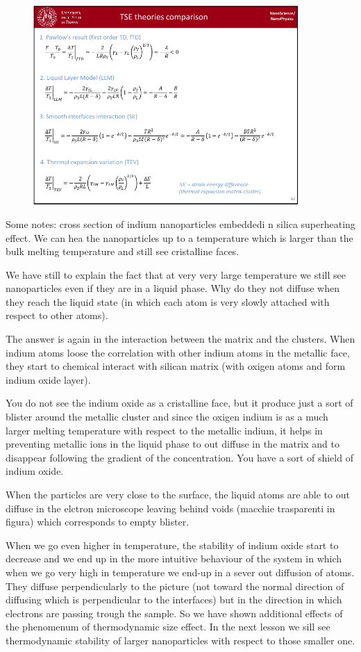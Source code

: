 \documentclass[../main/main.tex]{subfiles}
\begin{document}
\begin{figure}[h!]
\centering
\includegraphics[page=2,width=0.9\textwidth]{../lessons/pdf_file/5_lesson.pdf}
\end{figure}

Some notes: cross section of indium nanoparticles embeddedi n silica superheating effect. We can hea the nanoparticles up to a temperature which is larger than the bulk melting temperature and still see cristalline faces.

We have still to explain the fact that at very very large temperature we still see nanoparticles even if they are in a liquid phase. Why do they not diffuse when they reach the liquid state (in which each atom is very slowly attached with respect to other atoms).

The answer is again in the interaction between the matrix and the clusters. When indium atoms loose the correlation with other indium atoms in the metallic face, they start to chemical interact with silican matrix (with oxigen atoms and form indium oxide layer).

You do not see the indium oxide as a cristalline face, but it produce just a sort of blister around the metallic cluster and since the oxigen indium is as a much larger melting temperature with respect to the metallic indium, it helps in preventing metallic ions in the liquid phase to out diffuse in the matrix and to disappear following the gradient of the concentration. You have a sort of shield of indium oxide.

When the particles are very close to the surface, the liquid atoms are able to out diffuse in the elctron microscope leaving behind voids (macchie trasparenti in figura) which corresponds to empty blister.

When we go even higher in temperature, the stability of indium oxide start to decrease and we end up in the more intuitive behaviour of the system in which when we go very high in temperature we end-up in a sever out diffusion of atoms. They diffuse perpendicularly to the picture (not toward the normal direction of diffusing which is perpendicular to the interfaces) but in the direction in which electrons are passing trough the sample.
So we have shown additional effects of the phenomenum of thermodynamic size effect. In the next lesson we sill see thermodynamic stability of larger nanoparticles with respect to those smaller one.


\clearpage
\end{document}
